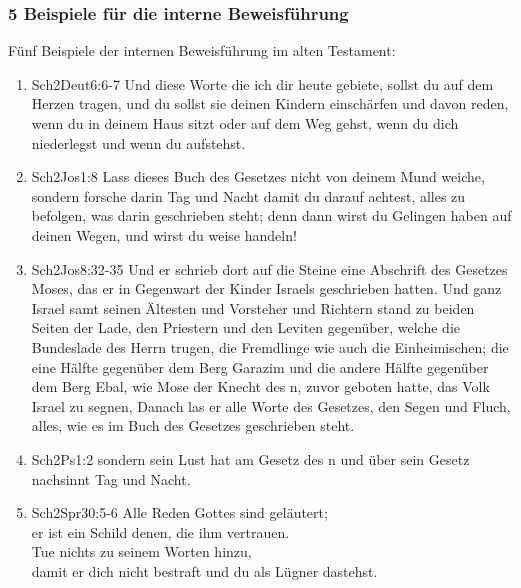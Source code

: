 \subsubsection{5 Beispiele für die interne Beweisführung}
Fünf Beispiele der internen Beweisführung im alten Testament:
\renewcommand{\labelenumi}{\Roman{enumi}}
\begin{enumerate}
	\item  
	\begin{bibeltext}{Sch2}{Deut}{6:6-7}
		Und diese Worte die ich dir heute gebiete, sollst du auf dem Herzen tragen, und du sollst sie deinen Kindern einschärfen und davon reden, wenn du in deinem Haus sitzt oder auf dem Weg gehst, wenn du dich niederlegst und wenn du aufstehst.
	\end{bibeltext}
	\item 
	\begin{bibeltext}{Sch2}{Jos}{1:8}
		Lass dieses Buch des Gesetzes nicht von deinem Mund weiche, sondern forsche darin Tag und Nacht damit du darauf achtest, alles zu befolgen, was darin geschrieben steht; denn dann wirst du Gelingen haben auf deinen Wegen, und wirst du weise handeln!
	\end{bibeltext}
	\item 
	\begin{bibeltext}{Sch2}{Jos}{8:32-35}
		Und er schrieb dort auf die Steine eine Abschrift des Gesetzes Moses, das er in Gegenwart der Kinder Israels geschrieben hatten. Und ganz Israel samt seinen Ältesten und Vorsteher und Richtern stand zu beiden Seiten der Lade, den Priestern und den Leviten gegenüber, welche die Bundeslade des Herrn trugen, die Fremdlinge wie auch die Einheimischen; die eine Hälfte gegenüber dem Berg Garazim und die andere Hälfte gegenüber dem Berg Ebal, wie Mose der Knecht des \herr n, zuvor geboten hatte, das Volk Israel zu segnen, Danach las er alle Worte des Gesetzes, den Segen und Fluch, alles, wie es im Buch des Gesetzes geschrieben steht.
	\end{bibeltext}
\item 
	\begin{bibeltext}{Sch2}{Ps}{1:2}
		sondern sein Lust hat am Gesetz des \herr n und über sein Gesetz nachsinnt Tag und Nacht.
	\end{bibeltext}
\item 
	\begin{bibeltext}{Sch2}{Spr}{30:5-6}
		Alle Reden Gottes sind geläutert;\\
		er ist ein Schild denen, die ihm vertrauen.\\
		Tue nichts zu seinem Worten hinzu,\\
		damit er dich nicht bestraft und du als Lügner dastehst.\\
	\end{bibeltext}
\end{enumerate}
